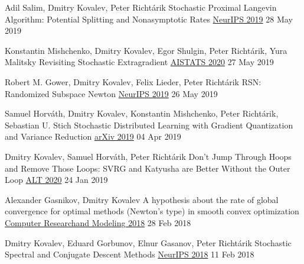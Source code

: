\begin{cventries}
\cventry
{Adil Salim, Dmitry Kovalev, Peter Richtárik} %
{Stochastic Proximal Langevin Algorithm: Potential Splitting and Nonasymptotic Rates} %
{\href{https://papers.nips.cc/paper/8891-stochastic-proximal-langevin-algorithm-potential-splitting-and-nonasymptotic-rates}{NeurIPS 2019}} 
{28 May 2019} %
{}	

\cventry
{Konstantin Mishchenko, Dmitry Kovalev, Egor Shulgin, Peter Richtárik, Yura Malitsky} %
{Revisiting Stochastic Extragradient} %
{\href{http://proceedings.mlr.press/v108/mishchenko20a}{AISTATS 2020}} 
{27 May 2019} %
{}	

\cventry
{Robert M. Gower, Dmitry Kovalev, Felix Lieder, Peter Richtárik} %
{RSN: Randomized Subspace Newton} %
{\href{https://papers.nips.cc/paper/8351-rsn-randomized-subspace-newton}{NeurIPS 2019}} 
{26 May 2019} %
{}	


\cventry
{Samuel Horváth, Dmitry Kovalev, Konstantin Mishchenko, Peter Richtárik, Sebastian U. Stich} %
{Stochastic Distributed Learning with Gradient Quantization and Variance Reduction} %
{\href{https://arxiv.org/abs/1904.05115}{arXiv 2019}} 
{04 Apr 2019} %
{}	

\cventry
{Dmitry Kovalev, Samuel Horváth, Peter Richtárik} %
{Don't Jump Through Hoops and Remove Those Loops: SVRG and Katyusha are Better Without the Outer Loop} %
{\href{http://proceedings.mlr.press/v117/kovalev20a}{ALT 2020}} 
{24 Jan 2019} %
{}	

\cventry
{Alexander Gasnikov, Dmitry Kovalev} %
{A hypothesis about the rate of global convergence for optimal methods (Newton's type) in smooth convex optimization} %
{\href{http://www.mathnet.ru/php/archive.phtml?wshow=paper\&jrnid=crm\&paperid=253\&option\_lang=eng}{
						Computer Research\linebreak and Modeling  2018}} 
{28 Feb 2018} %
{}	

\cventry
{Dmitry Kovalev, Eduard Gorbunov, Elnur Gasanov, Peter Richtárik} %
{Stochastic Spectral and Conjugate Descent Methods} %
{\href{https://papers.nips.cc/paper/7596-stochastic-spectral-and-conjugate-descent-methods}{NeurIPS 2018}} 
{11 Feb 2018} %
{}	


\end{cventries}
